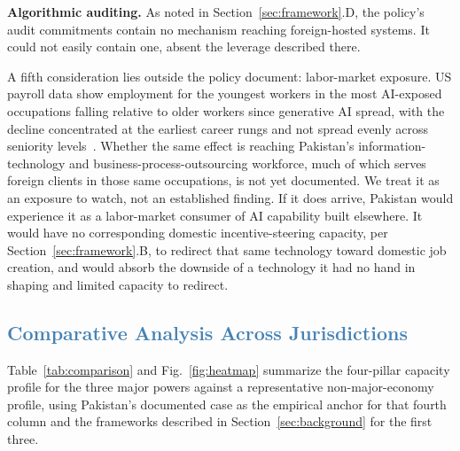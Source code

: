 \documentclass[journal]{IEEEtran}
\begin{document}
\textbf{Algorithmic auditing.} As noted in Section~\ref{sec:framework}.D, the policy's audit commitments contain no mechanism reaching foreign-hosted systems. It could not easily contain one, absent the leverage described there.

A fifth consideration lies outside the policy document: labor-market exposure. US payroll data show employment for the youngest workers in the most AI-exposed occupations falling relative to older workers since generative AI spread, with the decline concentrated at the earliest career rungs and not spread evenly across seniority levels~\cite{brynjolfsson2025canaries}.
Whether the same effect is reaching Pakistan's information-technology and business-process-outsourcing workforce, much of which serves foreign clients in those same occupations, is not yet documented. We treat it as an exposure to watch, not an established finding. If it does arrive, Pakistan would experience it as a labor-market consumer of AI capability built elsewhere. It would have no corresponding domestic incentive-steering capacity, per Section~\ref{sec:framework}.B, to redirect that same technology toward domestic job creation, and would absorb the downside of a technology it had no hand in shaping and limited capacity to redirect.


\subsection{\textcolor{steelblue}{Comparative Analysis Across Jurisdictions}}

Table~\ref{tab:comparison} and Fig.~\ref{fig:heatmap} summarize the four-pillar capacity profile for the three major powers against a representative non-major-economy profile, using Pakistan's documented case as the empirical anchor for that fourth column and the frameworks described in Section~\ref{sec:background} for the first three.
\end{document}
